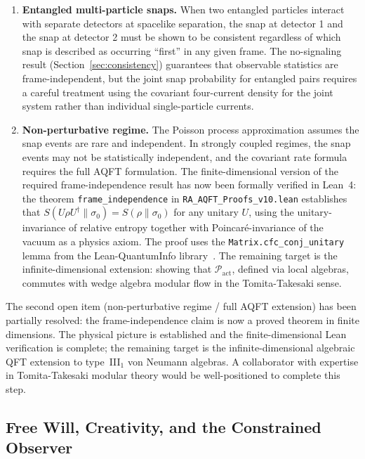 \documentclass[11pt,a4paper]{article}
\theoremstyle{plain}
\theoremstyle{definition}
\theoremstyle{remark}
\begin{document}
\begin{enumerate}[leftmargin=*]
  \item \textbf{Entangled multi-particle snaps.} When two entangled particles
  interact with separate detectors at spacelike separation, the snap at detector 1
  and the snap at detector 2 must be shown to be consistent regardless of which
  snap is described as occurring ``first'' in any given frame. The no-signaling
  result (Section~\ref{sec:consistency}) guarantees that observable statistics are
  frame-independent, but the joint snap probability for entangled pairs requires a
  careful treatment using the covariant four-current density for the joint system
  rather than individual single-particle currents.

  \item \textbf{Non-perturbative regime.} The Poisson process approximation
  assumes the snap events are rare and independent. In strongly coupled regimes,
  the snap events may not be statistically independent, and the covariant rate
  formula requires the full AQFT formulation. The finite-dimensional version of
  the required frame-independence result has now been formally verified in
  Lean~4: the theorem \texttt{frame\_independence} in
  \texttt{RA\_AQFT\_Proofs\_v10.lean} establishes that
  $S(U\rho U^\dagger \| \sigma_0) = S(\rho \| \sigma_0)$ for any unitary $U$,
  using the unitary-invariance of relative entropy together with
  Poincar\'{e}-invariance of the vacuum as a physics axiom. The proof uses the
  \texttt{Matrix.cfc\_conj\_unitary} lemma from the Lean-QuantumInfo
  library~\citep{Meiburg2025LQI}. The remaining target is the
  infinite-dimensional extension: showing that
  $\mathcal{P}_{\mathrm{act}}$, defined via local algebras, commutes with wedge
  algebra modular flow in the Tomita-Takesaki sense.
\end{enumerate}

The second open item (non-perturbative regime / full AQFT extension) has been
partially resolved: the frame-independence claim is now a proved theorem in finite
dimensions. The physical picture is established and the finite-dimensional
Lean verification is complete; the remaining target is the infinite-dimensional
algebraic QFT extension to type~III$_1$ von Neumann algebras. A collaborator
with expertise in Tomita-Takesaki modular theory would be well-positioned to
complete this step.

\subsection{Free Will, Creativity, and the Constrained Observer}
\end{document}
